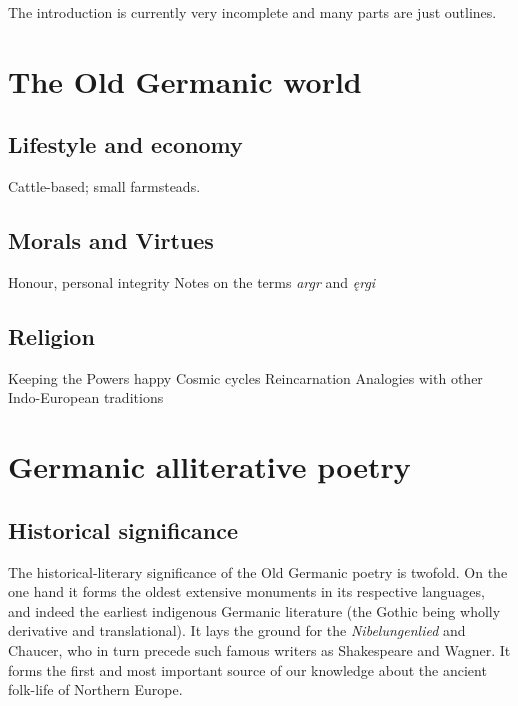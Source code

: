 \newpage\thispagestyle{empty}

\tableofcontents

\newpage

\thispagestyle{empty}

\newpage


\printbibliography%


The introduction is currently very incomplete and many parts are just outlines.

\section{The Old Germanic world}

  \subsection{Lifestyle and economy}
    Cattle-based; small farmsteads.
  \subsection{Morals and Virtues}
    Honour, personal integrity
    Notes on the terms \emph{argr} and \emph{ęrgi}
  \subsection{Religion}
    Keeping the Powers happy
    Cosmic cycles
    Reincarnation
    Analogies with other Indo-European traditions


\section{Germanic alliterative poetry}

  \subsection{Historical significance}

  The historical-literary significance of the Old Germanic poetry is twofold. On the one hand it forms the oldest extensive monuments in its respective languages, and indeed the earliest indigenous Germanic literature (the Gothic being wholly derivative and translational).  It lays the ground for the \emph{Nibelungenlied} and Chaucer, who in turn precede such famous writers as Shakespeare and Wagner.  It forms the first and most important source of our knowledge about the ancient folk-life of Northern Europe.

